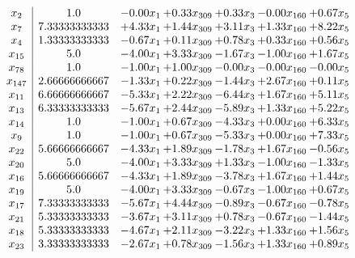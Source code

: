 \documentclass[8pt]{article}
\begin{document}
\[\begin{array}{c| c c@{\hskip 2pt} c@{\hskip 2pt} c@{\hskip 2pt} c@{\hskip 2pt} c@{\hskip 2pt} }
 x_{2}   &  1.0 & -0.00 x_{1} & +  0.33 x_{309} & +  0.33 x_{3} & -0.00 x_{160} & +  0.67 x_{5}\\
 x_{7}   &  7.33333333333 & +  4.33 x_{1} & +  1.44 x_{309} & +  3.11 x_{3} & +  1.33 x_{160} & +  8.22 x_{5}\\
 x_{4}   &  1.33333333333 & -0.67 x_{1} & +  0.11 x_{309} & +  0.78 x_{3} & +  0.33 x_{160} & +  0.56 x_{5}\\
 x_{15}   &  5.0 & -4.00 x_{1} & +  3.33 x_{309} & -1.67 x_{3} & -1.00 x_{160} & +  1.67 x_{5}\\
 x_{78}   &  1.0 & -1.00 x_{1} & +  1.00 x_{309} & -0.00 x_{3} & -0.00 x_{160} & -0.00 x_{5}\\
 x_{147}   &  2.66666666667 & -1.33 x_{1} & +  0.22 x_{309} & -1.44 x_{3} & +  2.67 x_{160} & +  0.11 x_{5}\\
 x_{11}   &  6.66666666667 & -5.33 x_{1} & +  2.22 x_{309} & -6.44 x_{3} & +  1.67 x_{160} & +  5.11 x_{5}\\
 x_{13}   &  6.33333333333 & -5.67 x_{1} & +  2.44 x_{309} & -5.89 x_{3} & +  1.33 x_{160} & +  5.22 x_{5}\\
 x_{14}   &  1.0 & -1.00 x_{1} & +  0.67 x_{309} & -4.33 x_{3} & +  0.00 x_{160} & +  6.33 x_{5}\\
 x_{9}   &  1.0 & -1.00 x_{1} & +  0.67 x_{309} & -5.33 x_{3} & +  0.00 x_{160} & +  7.33 x_{5}\\
 x_{22}   &  5.66666666667 & -4.33 x_{1} & +  1.89 x_{309} & -1.78 x_{3} & +  1.67 x_{160} & -0.56 x_{5}\\
 x_{20}   &  5.0 & -4.00 x_{1} & +  3.33 x_{309} & +  1.33 x_{3} & -1.00 x_{160} & -1.33 x_{5}\\
 x_{16}   &  5.66666666667 & -4.33 x_{1} & +  1.89 x_{309} & -3.78 x_{3} & +  1.67 x_{160} & +  1.44 x_{5}\\
 x_{19}   &  5.0 & -4.00 x_{1} & +  3.33 x_{309} & -0.67 x_{3} & -1.00 x_{160} & +  0.67 x_{5}\\
 x_{17}   &  7.33333333333 & -5.67 x_{1} & +  4.44 x_{309} & -0.89 x_{3} & -0.67 x_{160} & -0.78 x_{5}\\
 x_{21}   &  5.33333333333 & -3.67 x_{1} & +  3.11 x_{309} & +  0.78 x_{3} & -0.67 x_{160} & -1.44 x_{5}\\
 x_{18}   &  5.33333333333 & -4.67 x_{1} & +  2.11 x_{309} & -3.22 x_{3} & +  1.33 x_{160} & +  1.56 x_{5}\\
 x_{23}   &  3.33333333333 & -2.67 x_{1} & +  0.78 x_{309} & -1.56 x_{3} & +  1.33 x_{160} & +  0.89 x_{5}\\

\end{array}\]
\end{document}
